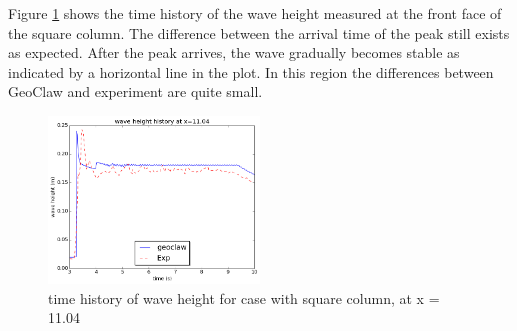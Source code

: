 \documentclass[11pt]{article}
\begin{document}
Figure \ref{fig:waveheight_square_x=11.04} shows the time history of the wave height measured at the front face of the square column. 
The difference between the arrival time of the peak still exists as expected. After the peak arrives, the wave gradually becomes stable as indicated by a horizontal line in the plot. In this region the differences between GeoClaw and experiment are quite small. 
\begin{figure}[h!]
    \centering
    \includegraphics[width=0.5\textwidth]{./plots/waveheight_square_x1104_largerTimeRange}
    \caption{time history of wave height for case with square column, at x = 11.04}
    \label{fig:waveheight_square_x=11.04}
\end{figure}
\end{document}
